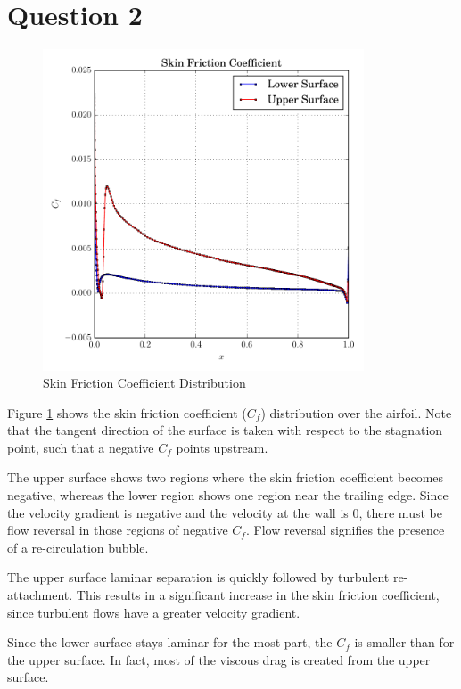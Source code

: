 \documentclass[letterpaper,12pt,]{article}
\begin{document}
\section*{Question 2}

\begin{figure}[!ht]
    \centering
    \includegraphics[width = 0.85\textwidth]{./Figures/q2.pdf}
    \caption {Skin Friction Coefficient Distribution}
    \label{fig:q2}
\end{figure}

Figure \ref{fig:q2} shows the skin friction coefficient ($C_f$) distribution over the airfoil.
Note that the tangent direction of the surface is taken with respect to the stagnation point, such that a negative $C_f$ points upstream.

The upper surface shows two regions where the skin friction coefficient becomes negative, whereas the lower region shows one region near the trailing edge.
Since the velocity gradient is negative and the velocity at the wall is 0, there must be flow reversal in those regions of negative $C_f$.
Flow reversal signifies the presence of a re-circulation bubble.

The upper surface laminar separation is quickly followed by turbulent re-attachment.
This results in a significant increase in the skin friction coefficient, since turbulent flows have a greater velocity gradient.

Since the lower surface stays laminar for the most part, the $C_f$ is smaller than for the upper surface. In fact, most of the viscous drag is created from the upper surface.
\end{document}
